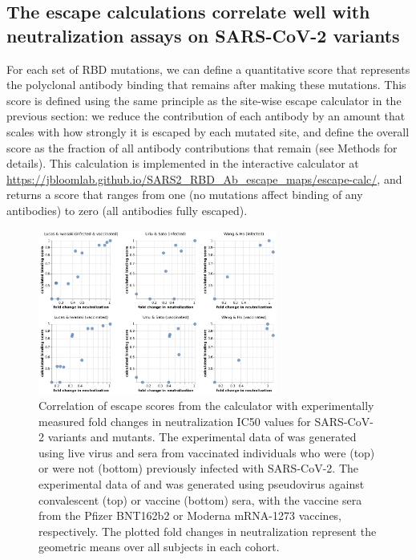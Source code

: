 \documentclass[9pt,twocolumn,twoside]{gsajnl_modified}
\begin{document}
\subsection{The escape calculations correlate well with neutralization assays on SARS-CoV-2 variants}
For each set of RBD mutations, we can define a quantitative score that represents the polyclonal antibody binding that remains after making these mutations.
This score is defined using the same principle as the site-wise escape calculator in the previous section: we reduce the contribution of each antibody by an amount that scales with how strongly it is escaped by each mutated site, and define the overall score as the fraction of all antibody contributions that remain (see Methods for details).
This calculation is implemented in the interactive calculator at \url{https://jbloomlab.github.io/SARS2_RBD_Ab_escape_maps/escape-calc/}, and returns a score that ranges from one (no mutations affect binding of any antibodies) to zero (all antibodies fully escaped).

\begin{figure}
\includegraphics[width=0.7\textwidth]{../results/neut_studies/neut_studies.png}
\caption{Correlation of escape scores from the calculator with experimentally measured fold changes in neutralization IC50 values for SARS-CoV-2 variants and mutants.
The experimental data of \citet{lucas2021impact} was generated using live virus and sera from vaccinated individuals who were (top) or were not (bottom) previously infected with SARS-CoV-2.
The experimental data of \citet{uriu2021neutralization} and \citet{wang2021antibody} was generated using pseudovirus against convalescent (top) or vaccine (bottom) sera, with the vaccine sera from the Pfizer BNT162b2 or Moderna mRNA-1273 vaccines, respectively. 
The plotted fold changes in neutralization represent the geometric means over all subjects in each cohort.
}
\label{fig:neut_studies}
\end{figure}
\end{document}

